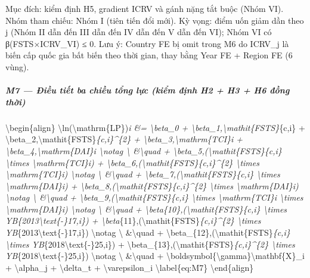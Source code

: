 \documentclass[12pt,a4paper]{article}
\begin{document}
Mục đích: kiểm định H5, gradient ICRV và gánh nặng tắt buộc (Nhóm VI).
Nhóm tham chiếu: Nhóm I (tiên tiến đổi mới). Kỳ vọng: điểm uốn giảm dần
theo j (Nhóm II dẫn đến III dẫn đến IV dẫn đến V dẫn đến VI); Nhóm VI có
β(FSTS×ICRV\_VI) ≤ 0. Lưu ý: Country FE bị omit trong M6 do ICRV\_j là
biến cấp quốc gia bất biến theo thời gian, thay bằng Year FE + Region FE
(6 vùng).

\hypertarget{m7--ux111iux1ec1u-tiux1ebft-ba-chiux1ec1u-tux1ed5ng-lux1ef1c-kiux1ec3m-ux111ux1ecbnh-h2--h3--h6-ux111ux1ed3ng-thux1eddi}{%
\subparagraph{M7 --- Điều tiết ba chiều tổng lực (kiểm định H2 + H3 + H6
đồng
thời)}\label{m7--ux111iux1ec1u-tiux1ebft-ba-chiux1ec1u-tux1ed5ng-lux1ef1c-kiux1ec3m-ux111ux1ecbnh-h2--h3--h6-ux111ux1ed3ng-thux1eddi}}

\textbackslash begin\{align\}
\textbackslash ln(\textbackslash mathrm\{LP\})\emph{i \&=
\textbackslash beta\_0 +
\textbackslash beta\_1,\textbackslash mathit\{FSTS\}}\{c,i\} +
\textbackslash beta\_2,\textbackslash mathit\{FSTS\}\emph{\{c,i\}\^{}\{2\}
+ \textbackslash beta\_3,\textbackslash mathrm\{TCI\}\emph{i +
\textbackslash beta\_4,\textbackslash mathrm\{DAI\}\emph{i
\textbackslash notag \textbackslash{} \&\textbackslash quad +
\textbackslash beta\_5,(\textbackslash mathit\{FSTS\}}\{c,i\}
\textbackslash times \textbackslash mathrm\{TCI\}\emph{i) +
\textbackslash beta\_6,(\textbackslash mathit\{FSTS\}}\{c,i\}\^{}\{2\}
\textbackslash times \textbackslash mathrm\{TCI\}\emph{i)
\textbackslash notag \textbackslash{} \&\textbackslash quad +
\textbackslash beta\_7,(\textbackslash mathit\{FSTS\}}\{c,i\}
\textbackslash times \textbackslash mathrm\{DAI\}\emph{i) +
\textbackslash beta\_8,(\textbackslash mathit\{FSTS\}}\{c,i\}\^{}\{2\}
\textbackslash times \textbackslash mathrm\{DAI\}\emph{i)
\textbackslash notag \textbackslash{} \&\textbackslash quad +
\textbackslash beta\_9,(\textbackslash mathit\{FSTS\}}\{c,i\}
\textbackslash times \textbackslash mathrm\{TCI\}\emph{i
\textbackslash times \textbackslash mathrm\{DAI\}\emph{i)
\textbackslash notag \textbackslash{} \&\textbackslash quad +
\textbackslash beta}\{10\},(\textbackslash mathit\{FSTS\}}\{c,i\}
\textbackslash times YB}\{2013\textbackslash text\{-\}17,i\}) +
\textbackslash beta}\{11\},(\textbackslash mathit\{FSTS\}\emph{\{c,i\}\^{}\{2\}
\textbackslash times YB}\{2013\textbackslash text\{-\}17,i\})
\textbackslash notag \textbackslash{} \&\textbackslash quad +
\textbackslash beta\_\{12\},(\textbackslash mathit\{FSTS\}\emph{\{c,i\}
\textbackslash times YB}\{2018\textbackslash text\{-\}25,i\}) +
\textbackslash beta\_\{13\},(\textbackslash mathit\{FSTS\}\emph{\{c,i\}\^{}\{2\}
\textbackslash times YB}\{2018\textbackslash text\{-\}25,i\})
\textbackslash notag \textbackslash{} \&\textbackslash quad +
\textbackslash boldsymbol\{\textbackslash gamma\}\textquotesingle\textbackslash mathbf\{X\}\_i
+ \textbackslash alpha\_j + \textbackslash delta\_t +
\textbackslash varepsilon\_i \textbackslash label\{eq:M7\}
\textbackslash end\{align\}
\end{document}
